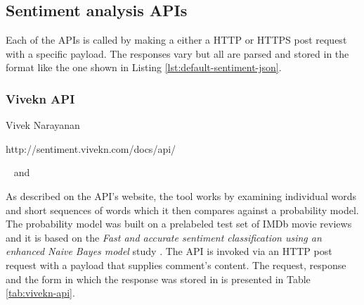 \newcommand*{\APIsOverviewPath}{04-framework/02-implementation/02-apis}

\subsection{Sentiment analysis APIs\label{sec:apis}}
Each of the APIs is called by making a either a HTTP or HTTPS post request with a specific payload. The responses vary but all are parsed and stored in the format like the one shown in Listing \ref{lst:default-sentiment-json}.

\subsubsection*{Vivekn API}

\begin{description}
\singlespacing
 \item[Author:] Vivek Narayanan
 \item[Web url:] http://sentiment.vivekn.com/docs/api/
 \item[Database columns:]  and 
\end{description}
As described on the API's website, the tool works by examining individual words and short sequences of words which it then compares against a probability model. The probability model was built on a prelabeled test set of IMDb movie reviews
and it is based on the \emph{Fast and accurate sentiment classification using an enhanced Naive Bayes model} study \cite{DBLP:journals/corr/abs-1305-6143}.
The API is invoked via an HTTP post request with a  payload that supplies comment's content. 
The request, response and the form in which the response was stored in  is presented in Table \ref{tab:vivekn-api}.




